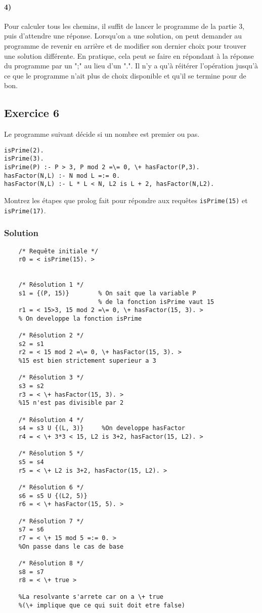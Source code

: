     \paragraph{4)} Pour calculer tous les chemins, il suffit de lancer le programme de la partie 3, puis d'attendre une réponse.
    Lorsqu'on a une solution, on peut demander au programme de revenir en arrière et de modifier son dernier choix pour trouver une solution différente.
    En pratique, cela peut se faire en répondant à la réponse du programme par un ";" au lieu d'un ".".
    Il n'y a qu'à réitérer l'opération jusqu'à ce que le programme n'ait plus de choix disponible et qu'il se termine pour de bon.
    

\subsection*{Exercice 6}
Le programme suivant d\'{e}cide si un nombre est premier ou pas.

\begin{verbatim}
isPrime(2).
isPrime(3).
isPrime(P) :- P > 3, P mod 2 =\= 0, \+ hasFactor(P,3).  
hasFactor(N,L) :- N mod L =:= 0.
hasFactor(N,L) :- L * L < N, L2 is L + 2, hasFactor(N,L2). 
\end{verbatim}
Montrez les \'{e}tapes que prolog fait pour r\'{e}pondre aux requ\^{e}tes \texttt{isPrime(15)} et \texttt{isPrime(17)}.

    \subsubsection{Solution}
    
    \begin{lstlisting}
    /* Requête initiale */
    r0 = < isPrime(15). >
    
    
    /* Résolution 1 */
    s1 = {(P, 15)}        % On sait que la variable P
                          % de la fonction isPrime vaut 15           
    r1 = < 15>3, 15 mod 2 =\= 0, \+ hasFactor(15, 3). >
    % On developpe la fonction isPrime
    
    /* Résolution 2 */
    s2 = s1
    r2 = < 15 mod 2 =\= 0, \+ hasFactor(15, 3). >
    %15 est bien strictement superieur a 3
    
    /* Résolution 3 */
    s3 = s2
    r3 = < \+ hasFactor(15, 3). >
    %15 n'est pas divisible par 2
    
    /* Résolution 4 */
    s4 = s3 U {(L, 3)}     %On developpe hasFactor
    r4 = < \+ 3*3 < 15, L2 is 3+2, hasFactor(15, L2). >
    
    /* Résolution 5 */
    s5 = s4
    r5 = < \+ L2 is 3+2, hasFactor(15, L2). >
    
    /* Résolution 6 */
    s6 = s5 U {(L2, 5)}
    r6 = < \+ hasFactor(15, 5). >
    
    /* Résolution 7 */  
    s7 = s6   
    r7 = < \+ 15 mod 5 =:= 0. >  
    %On passe dans le cas de base
    
    /* Résolution 8 */
    s8 = s7   
    r8 = < \+ true >
    
    %La resolvante s'arrete car on a \+ true 
    %(\+ implique que ce qui suit doit etre false)
    \end{lstlisting}

